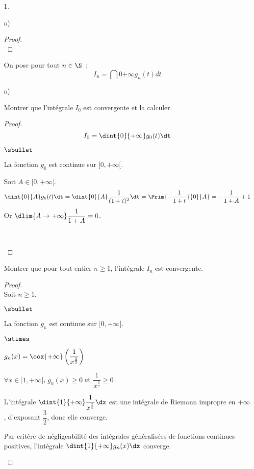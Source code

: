 \documentclass[11pt]{article}%
\begin{document}
\begin{noliste}{1.}
\begin{noliste}{a)}
\begin{proof}
 ~\\[-1cm]
\end{proof}
\end{noliste}


\item On pose pour tout $n \in \N$~:
\[ 
I_n = \dint{0}{+\infty} g_n(t) dt 
\]
\begin{noliste}{a)}
\item Montrer que l'intégrale $I_0$ est convergente et la calculer.

\begin{proof}~
 \[
  I_0=\dint{0}{+\infty} g_0(t)\dt
 \]
 \begin{noliste}{$\sbullet$}
  \item La fonction $g_0$ est continue sur $[0,+\infty[$.
  
  \item Soit $A \in [0,+\infty[$.
  \[
   \dint{0}{A} g_0(t) \dt =
   \dint{0}{A} \dfrac{1}{(1+t)^2} \dt = \Prim{-\dfrac{1}{1+t}}{0}{A}
   =-\dfrac{1}{1+A} +1
  \]
  Or $\dlim{A\to+\infty} \dfrac{1}{1+A} =0$.
  
  ~\\[-1.4cm]
 \end{noliste}
\end{proof}




\item Montrer que pour tout entier $n \geq 1$, l'intégrale $I_n$ 
est convergente.

\begin{proof}~\\
Soit $n\geq 1$.
 \begin{noliste}{$\sbullet$}
  \item La fonction $g_n$ est continue sur $[0,+\infty[$.
  
  \item
  \begin{noliste}{$\stimes$}
    \item $g_n(x) = \oox{+\infty} 
    \left(\dfrac{1}{x^{\frac{3}{2}}}\right)$
    \item $\forall x \in [1,+\infty[$, $g_n(x)\geq 0$ et 
    $\dfrac{1}{x^{\frac{3}{2}}}\geq 0$
    \item L'intégrale $\dint{1}{+\infty} \dfrac{1}{x^{\frac{3}{2}}}\dx$ 
    est une intégrale de Riemann impropre en $+\infty$, d'exposant 
    $\dfrac{3}{2}$, donc elle converge.
  \end{noliste}
  Par critère de négligeabilité des intégrales généralisées de 
  fonctions continues positives, l'intégrale
  $\dint{1}{+\infty} g_n(x) \dx$ converge.
  

\end{noliste}
\end{proof}
\end{noliste}
\end{noliste}
\end{document}
